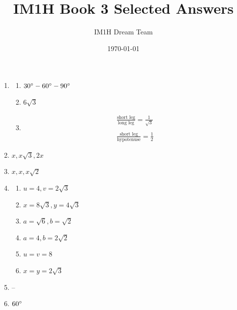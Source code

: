 \documentclass{article}
\title{IM1H Book 3 Selected Answers}
\author{IM1H Dream Team}
\date{\today}
\begin{document}
\maketitle

\begin{enumerate}

\item

	\begin{enumerate}
	
	\item $30 \degree - 60 \degree - 90 \degree$
	
	\item $6\sqrt{3}$
	
	\item
		\begin{gather*}
		\frac{\text{short leg}}{\text{long leg}} = \frac{1}{\sqrt{3}} \\
		\\
		\frac{\text{short leg}}{\text{hypotenuse}} = \frac{1}{2}
		\end{gather*}
	
	\end{enumerate}
	
\item $x, x\sqrt{3}, 2x$

\item $x, x, x\sqrt{2}$

\item

	\begin{enumerate}
	
	\item $u = 4, v = 2\sqrt{3}$
	
	\item $x = 8\sqrt{3}, y = 4\sqrt{3}$
	
	\item $a = \sqrt{6}, b = \sqrt{2}$
	
	\item $a = 4, b = 2\sqrt{2}$
	
	\item $u = v = 8$
	
	\item $x = y = 2\sqrt{3}$
	
	\end{enumerate}
	
\item --

\item $60 \degree$


\end{enumerate}
\end{document}
